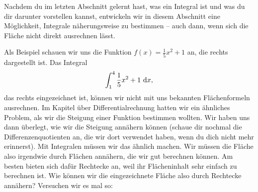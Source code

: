 \documentclass[../../main.tex]{subfiles}
\begin{document}
\label{das-riemann-integral}
Nachdem du im letzten Abschnitt gelernt hast, was ein Integral ist und was du dir darunter vorstellen kannst,
entwickeln wir in diesem Abschnitt eine Möglichkeit, Integrale näherungsweise zu bestimmen -- auch dann, wenn sich
die Fläche nicht direkt ausrechnen lässt.

Als Beispiel schauen wir uns die Funktion $f(x)=\frac{1}{5}x^2+1$ an, die rechts dargestellt ist. Das Integral
\[\int_1^4\frac{1}{5}x^2+1\mathop{}\mathrm{d} x,\]
das rechts eingezeichnet ist, können wir nicht mit uns bekannten Flächenformeln ausrechnen. Im Kapitel über 
Differentialrechnung hatten wir ein ähnliches Problem, als wir die Steigung einer Funktion bestimmen wollten. Wir haben
uns dann überlegt, wie wir die Steigung annähern können (schaue dir nochmal die Differenzenquotienten an, die wir dort
verwendet haben, wenn du dich nicht mehr erinnerst). Mit Integralen müssen wir das ähnlich machen. Wir müssen die
Fläche also irgendwie durch Flächen annähern, die wir gut berechnen können. Am besten bieten sich dafür Rechtecke an,
weil ihr Flächeninhalt sehr einfach zu berechnen ist. Wie können wir die eingezeichnete Fläche also durch Rechtecke 
annähern? Versuchen wir es mal so:
\end{document}

